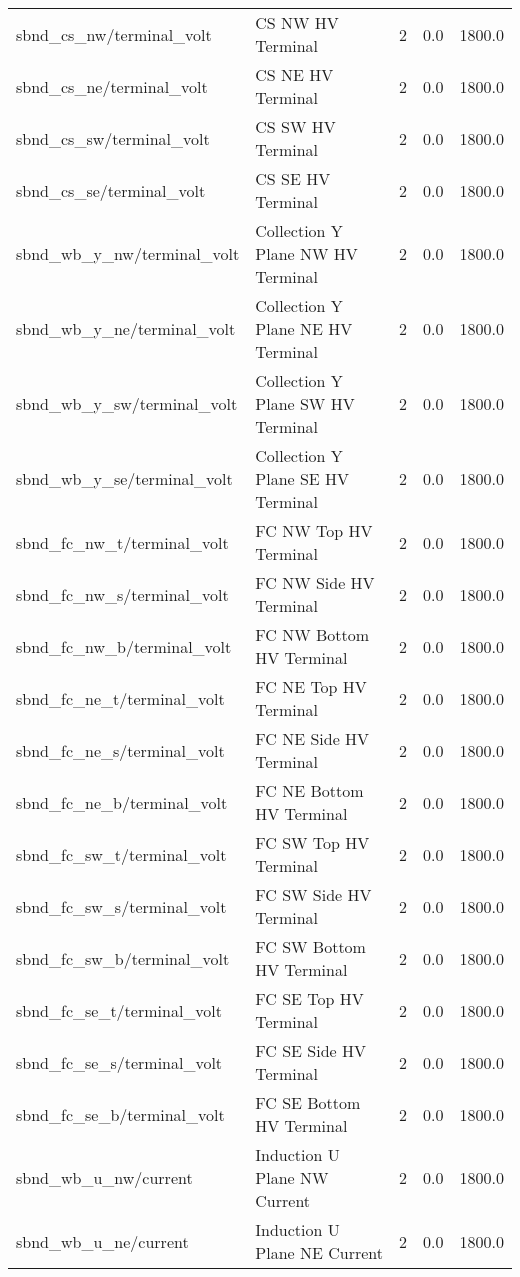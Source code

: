 \begin{center}
\begin{longtable}{l | l l l l }
sbnd\_cs\_nw/terminal\_volt & CS NW HV Terminal & 2 & 0.0 & 1800.0\\ 
sbnd\_cs\_ne/terminal\_volt & CS NE HV Terminal & 2 & 0.0 & 1800.0\\ 
sbnd\_cs\_sw/terminal\_volt & CS SW HV Terminal & 2 & 0.0 & 1800.0\\ 
sbnd\_cs\_se/terminal\_volt & CS SE HV Terminal & 2 & 0.0 & 1800.0\\ 
sbnd\_wb\_y\_nw/terminal\_volt & Collection Y Plane NW HV Terminal & 2 & 0.0 & 1800.0\\ 
sbnd\_wb\_y\_ne/terminal\_volt & Collection Y Plane NE HV Terminal & 2 & 0.0 & 1800.0\\ 
sbnd\_wb\_y\_sw/terminal\_volt & Collection Y Plane SW HV Terminal & 2 & 0.0 & 1800.0\\ 
sbnd\_wb\_y\_se/terminal\_volt & Collection Y Plane SE HV Terminal & 2 & 0.0 & 1800.0\\ 
sbnd\_fc\_nw\_t/terminal\_volt & FC NW Top HV Terminal & 2 & 0.0 & 1800.0\\ 
sbnd\_fc\_nw\_s/terminal\_volt & FC NW Side HV Terminal & 2 & 0.0 & 1800.0\\ 
sbnd\_fc\_nw\_b/terminal\_volt & FC NW Bottom HV Terminal & 2 & 0.0 & 1800.0\\ 
sbnd\_fc\_ne\_t/terminal\_volt & FC NE Top HV Terminal & 2 & 0.0 & 1800.0\\ 
sbnd\_fc\_ne\_s/terminal\_volt & FC NE Side HV Terminal & 2 & 0.0 & 1800.0\\ 
sbnd\_fc\_ne\_b/terminal\_volt & FC NE Bottom HV Terminal & 2 & 0.0 & 1800.0\\ 
sbnd\_fc\_sw\_t/terminal\_volt & FC SW Top HV Terminal & 2 & 0.0 & 1800.0\\ 
sbnd\_fc\_sw\_s/terminal\_volt & FC SW Side HV Terminal & 2 & 0.0 & 1800.0\\ 
sbnd\_fc\_sw\_b/terminal\_volt & FC SW Bottom HV Terminal & 2 & 0.0 & 1800.0\\ 
sbnd\_fc\_se\_t/terminal\_volt & FC SE Top HV Terminal & 2 & 0.0 & 1800.0\\ 
sbnd\_fc\_se\_s/terminal\_volt & FC SE Side HV Terminal & 2 & 0.0 & 1800.0\\ 
sbnd\_fc\_se\_b/terminal\_volt & FC SE Bottom HV Terminal & 2 & 0.0 & 1800.0\\ 
sbnd\_wb\_u\_nw/current & Induction U Plane NW Current & 2 & 0.0 & 1800.0\\ 
sbnd\_wb\_u\_ne/current & Induction U Plane NE Current & 2 & 0.0 & 1800.0\\ 

\end{longtable}
\end{center}
